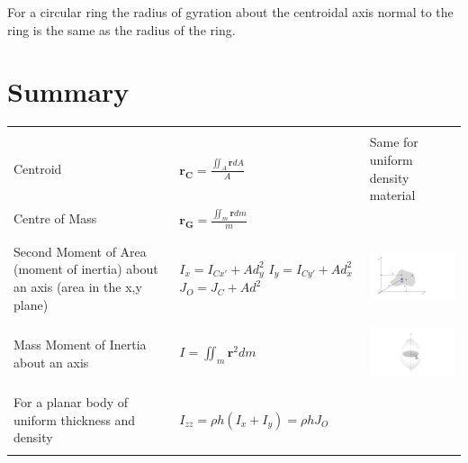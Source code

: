 \documentclass[12pt,letterpaper,twoside]{report}
\begin{document}
For a circular ring the radius of gyration about the centroidal axis normal to the ring is the same as the radius of the ring.

\newpage

\section{Summary}
\begin{center}
\begin{tabu} to 1\textwidth {  | X[1, l]  | X[1, c] | X[1, l] | }
\hline
 & & \\
Centroid & $\displaystyle \bm{r_C} =\frac{\displaystyle  \iint_A \bm{r} dA}{A} $ & Same for uniform density material\\

Centre of Mass & $\displaystyle \bm{r_G} =\frac{\displaystyle  \iint_m \bm{r} dm}{m} $ &  \\
& & \\
\hline
& & \\
Second Moment of Area (moment of inertia) about an axis (area in the x,y plane) & $I_x= I_{Cx'} + A d_y^2$ $I_y= I_{Cy'} + A d_x^2$ $J_O= J_{C} + A d^2$ & \includegraphics[trim={1cm 2cm 8cm 1cm},clip,width=2.3in]{Slide42}\\
& & \\
\hline
& & \\
Mass Moment of Inertia about an axis & $\displaystyle I =  \iint_m \bm{r}^2 dm$ & \includegraphics[trim={8cm 1cm 5cm 1.5cm},clip,width=2.3in]{Slide44}\\
& &\\
\hline
& &\\
For a planar body of uniform thickness and density & $\displaystyle I_{zz} = \rho h (I_x + I_y) = \rho h J_O$ & \\
& &\\

\end{tabu}
\end{center}
\end{document}
